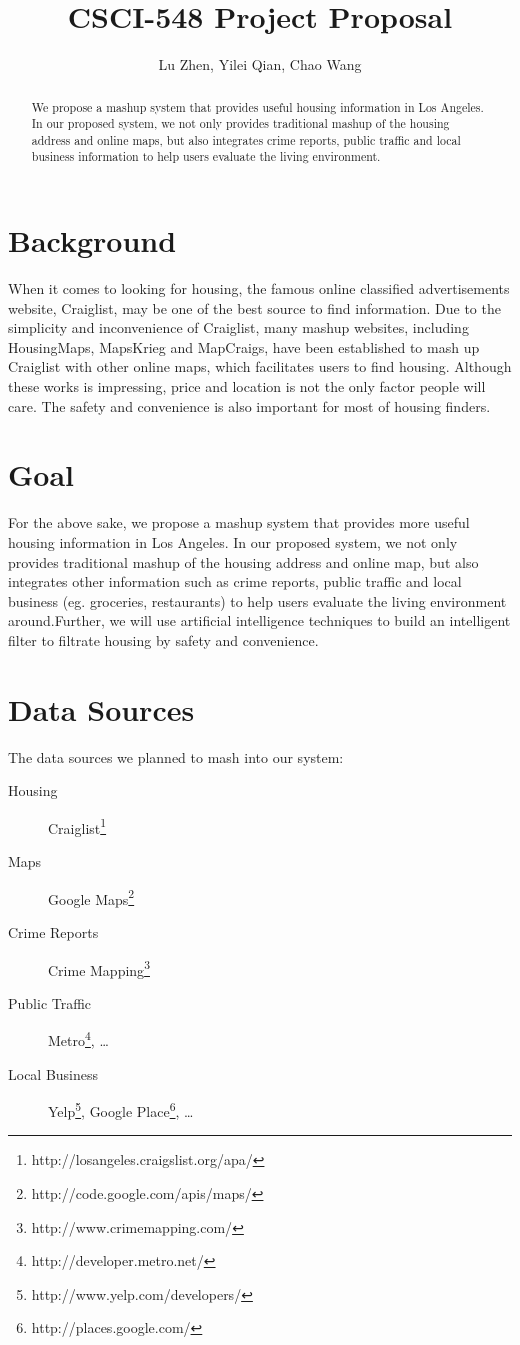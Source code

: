 \documentclass{llncs}
\title{CSCI-548 Project Proposal}
\author{Lu Zhen, Yilei Qian, Chao Wang}
\institute{University of Southern California}
\begin{document}
\maketitle

\begin{abstract}
We propose a mashup system that provides useful housing information in Los Angeles. In our proposed system, we not only provides traditional mashup of the housing address and online maps, but also integrates crime reports, public traffic and local business information to help users evaluate the living environment.   
\end{abstract}


\section{Background}

When it comes to looking for housing, the famous online classified advertisements website, Craiglist\texttrademark, may be one of the best source to find information. Due to the simplicity and inconvenience of Craiglist, many mashup websites, including HousingMaps, MapsKrieg and MapCraigs, have been established to mash up Craiglist with other online maps, which facilitates users to find housing.
Although these works is impressing, price and location is not the only factor people will care. The safety and convenience is also important for most of housing finders. 


\section{Goal}

For the above sake, we propose a mashup system that provides more useful housing information in Los Angeles. In our proposed system, we not only provides traditional mashup of the housing address and online map, but also integrates other information such as crime reports, public traffic and local business (eg. groceries, restaurants) to help users evaluate the living environment around.Further, we will use artificial intelligence techniques to build an intelligent filter to filtrate housing by safety and convenience. 


\section{Data Sources}

The data sources we planned to mash into our system: 
\begin{description}
  \item[Housing] Craiglist\footnote{http://losangeles.craigslist.org/apa/}
  \item[Maps] Google Maps\footnote{http://code.google.com/apis/maps/}
  \item[Crime Reports]  Crime Mapping\footnote{http://www.crimemapping.com/}
  \item[Public Traffic]  Metro\footnote{http://developer.metro.net/}, \ldots
  \item[Local Business]  Yelp\footnote{http://www.yelp.com/developers/}, Google Place\footnote{http://places.google.com/}, \ldots
\end{description}
\end{document}
